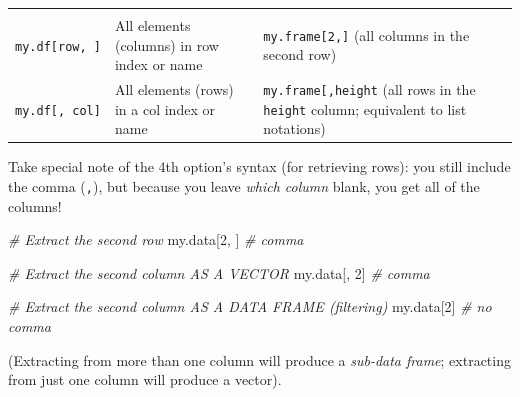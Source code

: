 \documentclass[]{book}
\newenvironment{Shaded}{\begin{snugshade}}{\end{snugshade}}
\newcommand{\DecValTok}[1]{\textcolor[rgb]{0.00,0.00,0.81}{#1}}
\newcommand{\CommentTok}[1]{\textcolor[rgb]{0.56,0.35,0.01}{\textit{#1}}}
\newcommand{\NormalTok}[1]{#1}
\theoremstyle{definition}
\theoremstyle{definition}
\theoremstyle{remark}
\begin{document}
\begin{longtable}[]{@{}lll@{}}
\begin{minipage}[t]{0.37\columnwidth}
\end{minipage}\tabularnewline
\begin{minipage}[t]{0.28\columnwidth}\raggedright\strut
\texttt{my.df{[}row,\ {]}}\strut
\end{minipage} & \begin{minipage}[t]{0.27\columnwidth}\raggedright\strut
All elements (columns) in row index or name\strut
\end{minipage} & \begin{minipage}[t]{0.37\columnwidth}\raggedright\strut
\texttt{my.frame{[}2,{]}} (all columns in the second row)\strut
\end{minipage}\tabularnewline
\begin{minipage}[t]{0.28\columnwidth}\raggedright\strut
\texttt{my.df{[},\ col{]}}\strut
\end{minipage} & \begin{minipage}[t]{0.27\columnwidth}\raggedright\strut
All elements (rows) in a col index or name\strut
\end{minipage} & \begin{minipage}[t]{0.37\columnwidth}\raggedright\strut
\texttt{my.frame{[},\textquotesingle{}height\textquotesingle{}{]}} (all
rows in the \texttt{height} column; equivalent to list notations)\strut
\end{minipage}\tabularnewline
\bottomrule
\end{longtable}

Take special note of the 4th option's syntax (for retrieving rows): you
still include the comma (\texttt{,}), but because you leave \emph{which
column} blank, you get all of the columns!

\begin{Shaded}
\begin{Highlighting}[]
\CommentTok{# Extract the second row}
\NormalTok{my.data[}\DecValTok{2}\NormalTok{, ]  }\CommentTok{# comma}

\CommentTok{# Extract the second column AS A VECTOR}
\NormalTok{my.data[, }\DecValTok{2}\NormalTok{]  }\CommentTok{# comma}

\CommentTok{# Extract the second column AS A DATA FRAME (filtering)}
\NormalTok{my.data[}\DecValTok{2}\NormalTok{]  }\CommentTok{# no comma}
\end{Highlighting}
\end{Shaded}

(Extracting from more than one column will produce a \emph{sub-data
frame}; extracting from just one column will produce a vector).
\end{document}
